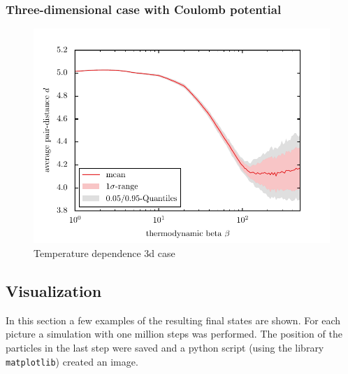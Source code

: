 \documentclass[11pt, a4paper]{article}
\numberwithin{equation}{section}
\begin{document}
\subsubsection{Three-dimensional case with Coulomb potential}
\begin{figure}
	\centering
	\includegraphics{./figures/temp_dep_coulomb3d.pdf}
	\caption{Temperature dependence 3d case}
\end{figure}



\subsection{Visualization} \label{sec:Visualisation}
In this section a few examples of the resulting final states are shown.
For each picture a simulation with one million steps was performed.
The position of the particles in the last step were saved and a python script (using the library \texttt{matplotlib}) created an image.
\end{document}
